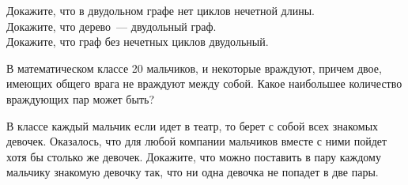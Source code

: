 \begin{problems}
\item
\sbp Докажите, что в двудольном графе нет циклов нечетной длины.
\\
\sbp Докажите, что дерево~--- двудольный граф.
\\
\sbp Докажите, что граф без нечетных циклов двудольный.

\item
В математическом классе 20 мальчиков, и некоторые враждуют, причем двое,
имеющих общего врага не враждуют между собой.
Какое наибольшее количество враждующих пар может быть?

\item
В классе каждый мальчик если идет в театр, то берет с собой всех знакомых
девочек.
Оказалось, что для любой компании мальчиков вместе с ними пойдет хотя бы
столько же девочек.
Докажите, что можно поставить в пару каждому мальчику знакомую девочку так, что
ни одна девочка не попадет в две пары.

\end{problems}

